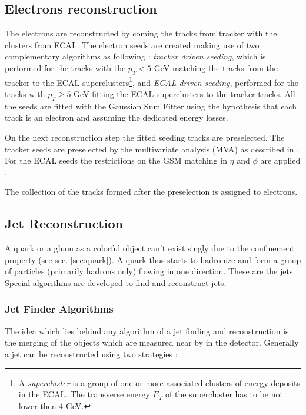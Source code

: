 \subsection{Electrons reconstruction}\label{ssec:ElRec}

The electrons are reconstructed by coming the tracks from tracker with the clusters from ECAL. The electron seeds
are created making use of two complementary algorithms as following \cite{CMS-PAS-EGM-10-004}: \textit{tracker driven seeding}, 
which is performed for the tracks with the $p_{T} < 5$ GeV matching the tracks from the tracker to the ECAL superclusters\footnote
{A \textit{supercluster} is a group of one or more associated clusters of energy deposits in the ECAL. The transverse energy $E_{T}$
of the supercluster has to be not lower then 4 GeV.}, and \textit{ECAL driven seeding}, performed for the tracks with $p_{T} \geq 5$ GeV
fitting the ECAL superclusters to the tracker tracks. All the seeds are fitted with the Gaussian Sum Fitter \cite{GSF_Electron_Reconstruction_CMS}
using the hypothesis that each track is an electron and assuming the dedicated energy losses.

On the next reconstruction step the fitted seeding tracks are preselected. The tracker seeds are preselected by the multivariate analysis 
(MVA) as described in \cite{CMS:2010byl}. For the ECAL seeds the restrictions on the GSM matching in $\eta$ and $\phi$ are applied \cite{Baffioni:2006cd}.

The collection of the tracks formed after the preselection is assigned to electrons.

\subsection{Jet Reconstruction}

A quark or a gluon as a colorful object can't exist singly due to the confinement property (see sec. \ref{sec:quark}).
A quark thus starts to hadronize and form a group of particles (primarily hadrons only) flowing in one direction. These are the jets. Special algorithms are developed
to find and reconstruct jets.

\subsubsection{Jet Finder Algorithms}

The idea which lies behind any algorithm of a jet finding and reconstruction is the merging of the objects which are measured near by in the detector.
Generally a jet can be reconstructed using two strategies \cite{Salam:2007xv}:

